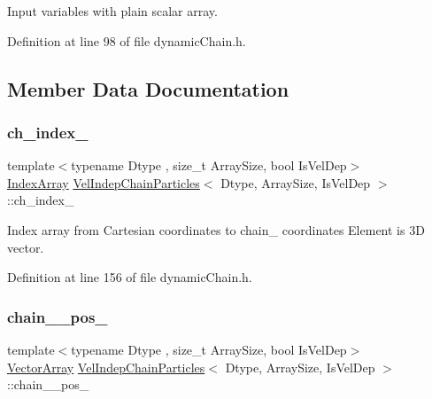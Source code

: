 Input variables with plain scalar array. 



Definition at line 98 of file dynamic\+Chain.\+h.



\subsection{Member Data Documentation}
\mbox{\label{class_vel_indep_chain_particles_a8f10bc65c3e0de542db29178824522cb}} 
\subsubsection{\texorpdfstring{ch\+\_\+index\+\_\+}{ch\_index\_}}
{\footnotesize\ttfamily template$<$typename Dtype , size\+\_\+t Array\+Size, bool Is\+Vel\+Dep$>$ \\
\mbox{\hyperlink{class_vel_indep_chain_particles_a691749351fb710d16619ef6cc43bb1e6}{Index\+Array}} \mbox{\hyperlink{class_vel_indep_chain_particles}{Vel\+Indep\+Chain\+Particles}}$<$ Dtype, Array\+Size, Is\+Vel\+Dep $>$\+::ch\+\_\+index\+\_\+\hspace{0.3cm}{\ttfamily [protected]}}



Index array from Cartesian coordinates to chain_ coordinates Element is 3D vector.



Definition at line 156 of file dynamic\+Chain.\+h.

\mbox{\label{class_vel_indep_chain_particles_a8e2defc6dcb9986dbc9c8c62215331aa}} 
\subsubsection{\texorpdfstring{chain_\+\_\+pos\+\_\+}{chain_\_pos\_}}
{\footnotesize\ttfamily template$<$typename Dtype , size\+\_\+t Array\+Size, bool Is\+Vel\+Dep$>$ \\
\mbox{\hyperlink{class_vel_indep_particles_a27580f65b6523bfb6900520af2e44708}{Vector\+Array}} \mbox{\hyperlink{class_vel_indep_chain_particles}{Vel\+Indep\+Chain\+Particles}}$<$ Dtype, Array\+Size, Is\+Vel\+Dep $>$\+::chain_\+\_\+pos\+\_\+\hspace{0.3cm}{\ttfamily [protected]}}



